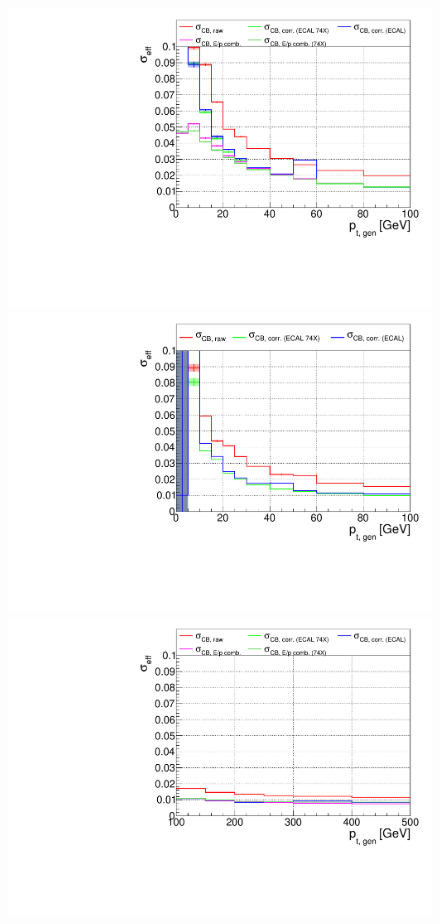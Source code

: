 \begin{figure}[hbtp]
  \begin{center}
    \includegraphics[width=\halflinewidth]{img/regression/pt100_effsigma_electrons.pdf}
    \includegraphics[width=\halflinewidth]{img/regression/pt100_effsigma_photons.pdf}
    \\
    \includegraphics[width=\halflinewidth]{img/regression/pt500_effsigma_electrons.pdf}

\end{center}
\end{figure}

